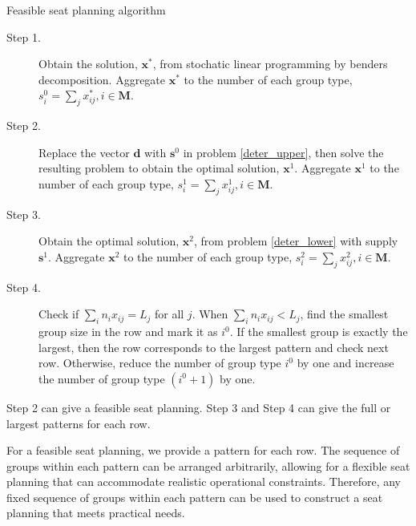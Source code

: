 \begin{algorithm}[H]
  \caption{Feasible seat planning algorithm}\label{feasible_seat}
    \begin{description}
    \item[Step 1.] Obtain the solution, $\mathbf{x}^{*}$, from stochatic linear programming by benders decomposition. Aggregate $\mathbf{x}^{*}$ to the number of each group type, ${s}_{i}^{0} =\sum_{j} x^{*}_{ij}, i \in \mathbf{M}$.

    \item[Step 2.] 
    Replace the vector $\mathbf{d}$ with $\mathbf{s}^{0}$ in problem \eqref{deter_upper}, then solve the resulting problem to obtain the optimal solution, $\mathbf{x}^{1}$. Aggregate $\mathbf{x}^{1}$ to the number of each group type, ${s}_{i}^{1} = \sum_{j} x^{1}_{ij}, i \in \mathbf{M}$.
    
    \item[Step 3.] Obtain the optimal solution, $\mathbf{x}^{2}$, from problem \eqref{deter_lower} with supply $\mathbf{s}^{1}$. Aggregate $\mathbf{x}^{2}$ to the number of each group type, ${s}_{i}^{2} = \sum_{j} x^{2}_{ij}, i \in \mathbf{M}$.

    \item[Step 4.] Check if $\sum_{i} n_i x_{ij} = L_j$ for all $j$. When $\sum_{i} n_i x_{ij} < L_j$, find the smallest group size in the row and mark it as $i^0$. If the smallest group is exactly the largest, then the row corresponds to the largest pattern and check next row. Otherwise, reduce the number of group type $i^0$ by one and increase the number of group type $(i^0+1)$ by one.
   \end{description}
  \end{algorithm}

\begin{remark}
  Step 2 can give a feasible seat planning. Step 3 and Step 4 can give the full or largest patterns for each row.
\end{remark}




\begin{remark}
For a feasible seat planning, we provide a pattern for each row. The sequence of groups within each pattern can be arranged arbitrarily, allowing for a flexible seat planning that can accommodate realistic operational constraints. Therefore, any fixed sequence of groups within each pattern can be used to construct a seat planning that meets practical needs.
\end{remark}